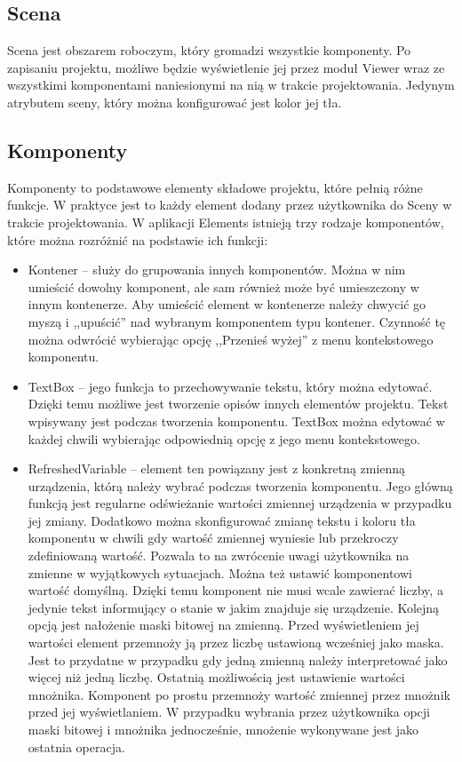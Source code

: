 \subsection{Scena}
Scena jest obszarem roboczym, który gromadzi wszystkie komponenty. Po zapisaniu projektu, możliwe będzie wyświetlenie jej przez moduł Viewer wraz ze wszystkimi komponentami naniesionymi na nią w trakcie projektowania. Jedynym atrybutem sceny, który można konfigurować jest kolor jej tła.

\subsection{Komponenty}
Komponenty to podstawowe elementy składowe projektu, które pełnią różne funkcje. W praktyce jest to każdy element dodany przez użytkownika do Sceny w trakcie projektowania. W aplikacji Elements istnieją trzy rodzaje komponentów, które można rozróżnić na podstawie ich funkcji:
\begin{itemize}
	\item Kontener – służy do grupowania innych komponentów. Można w nim umieścić dowolny komponent, ale sam również może być umieszczony w innym kontenerze. Aby umieścić element w kontenerze należy chwycić go myszą i ,,upuścić'' nad wybranym komponentem typu kontener. Czynność tę można odwrócić wybierając opcję ,,Przenieś wyżej'' z menu kontekstowego komponentu.
	\item TextBox – jego funkcja to przechowywanie tekstu, który można edytować. Dzięki temu możliwe jest tworzenie opisów innych elementów projektu. Tekst wpisywany jest podczas tworzenia komponentu. TextBox można edytować w każdej chwili wybierając odpowiednią opcję z jego menu kontekstowego.
	\item RefreshedVariable – element ten powiązany jest z konkretną zmienną urządzenia, którą należy wybrać podczas tworzenia komponentu. Jego główną funkcją jest regularne odświeżanie wartości zmiennej urządzenia w przypadku jej zmiany. Dodatkowo można skonfigurować zmianę tekstu i koloru tła komponentu w chwili gdy wartość zmiennej wyniesie lub przekroczy zdefiniowaną wartość. Pozwala to na zwrócenie uwagi użytkownika na zmienne w wyjątkowych sytuacjach. Można też ustawić komponentowi wartość domyślną. Dzięki temu komponent nie musi wcale zawierać liczby, a jedynie tekst informujący o stanie w jakim znajduje się urządzenie. Kolejną opcją jest nałożenie maski bitowej na zmienną. Przed wyświetleniem jej wartości element przemnoży ją przez liczbę ustawioną wcześniej jako maska. Jest to przydatne w przypadku gdy jedną zmienną należy interpretować jako więcej niż jedną liczbę. Ostatnią możliwością jest ustawienie wartości mnożnika. Komponent po prostu przemnoży wartość zmiennej przez mnożnik przed jej wyświetlaniem. W przypadku wybrania przez użytkownika opcji maski bitowej i mnożnika jednocześnie, mnożenie wykonywane jest jako ostatnia operacja.
\end{itemize}

